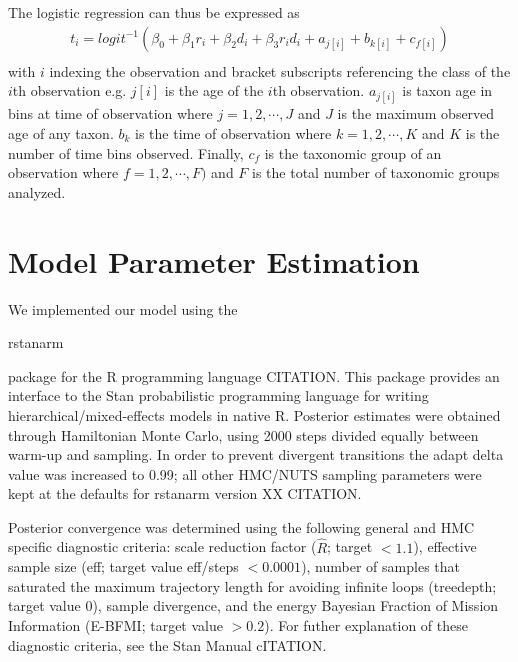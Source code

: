 \documentclass[12pt,letterpaper]{article}
\begin{document}
The logistic regression can thus be expressed as 
\begin{equation}
  \begin{aligned}
    t_{i} = logit^{-1}(\beta_{0} + \beta_{1} r_{i} + \beta_{2} d_{i} + \beta_{3} r_{i} d_{i} + a_{j[i]} + b_{k[i]} + c_{f[i]}) \\
  \end{aligned}
  \label{eq:core}
\end{equation}
with \(i\) indexing the observation and bracket subscripts referencing the class of the \(i\)th observation e.g. \(j[i]\) is the age of the \(i\)th observation. \(a_{j[i]}\) is taxon age in bins at time of observation where \(j = 1, 2, \cdots, J\) and \(J\) is the maximum observed age of any taxon. \(b_{k}\) is the time of observation where \(k = 1, 2, \cdots, K\) and \(K\) is the number of time bins observed. Finally, \(c_{f}\) is the taxonomic group of an observation where \(f = 1, 2, \cdots, F)\) and \(F\) is the total number of taxonomic groups analyzed.



\section{Model Parameter Estimation}

We implemented our model using the \begin{texttt}rstanarm\end{texttt} package for the R programming language CITATION. This package provides an interface to the Stan probabilistic programming language for writing hierarchical/mixed-effects models in native R. Posterior estimates were obtained through Hamiltonian Monte Carlo, using 2000 steps divided equally between warm-up and sampling. In order to prevent divergent transitions the adapt delta value was increased to 0.99; all other HMC/NUTS sampling parameters were kept at the defaults for rstanarm version XX CITATION. 

Posterior convergence was determined using the following general and HMC specific diagnostic criteria: scale reduction factor (\(\hat{R}\); target \(<1.1\)), effective sample size (eff; target value eff/steps \(<0.0001\)), number of samples that saturated the maximum trajectory length for avoiding infinite loops (treedepth; target value 0), sample divergence, and the energy Bayesian Fraction of Mission Information (E-BFMI; target value \(>0.2\)). For futher explanation of these diagnostic criteria, see the Stan Manual cITATION.
\end{document}
